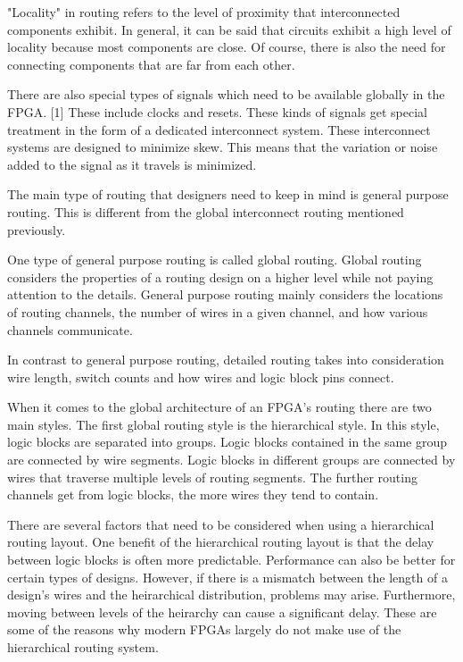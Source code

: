 \documentclass{article}
\begin{document}
    "Locality" in routing refers to the level of proximity that interconnected components
    exhibit. In general, it can be said that circuits exhibit a high level of locality
    because most components are close. Of course, there is also the need for connecting
    components that are far from each other.

    There are also special types of signals which need to be available globally
    in the FPGA. [1] These include clocks and resets. These kinds of signals get
    special treatment in the form of a dedicated interconnect system. These
    interconnect systems are designed to minimize skew. This means that the
    variation or noise added to the signal as it travels is minimized.

    The main type of routing that designers need to keep in mind is
    general purpose routing. This is different from the global interconnect routing
    mentioned previously.
    
    One type of general purpose routing is called global routing. Global routing
    considers the properties of a routing design on a higher level while not paying attention
    to the details. General purpose routing mainly considers the locations of routing
    channels, the number of wires in a given channel, and how various channels communicate.

    In contrast to general purpose routing, detailed routing takes into consideration
    wire length, switch counts and how wires and logic block pins connect.

    When it comes to the global architecture of an FPGA's routing there are two main styles.
    The first global routing style is the hierarchical style. In this style,
    logic blocks are separated into groups. Logic blocks contained in the same group
    are connected by wire segments. Logic blocks in different groups are connected
    by wires that traverse multiple levels of routing segments.
    The further routing channels get from logic blocks, the more wires they tend to contain.

    There are several factors that need to be considered when using a hierarchical routing
    layout. One benefit of the hierarchical routing layout is that the delay
    between logic blocks is often more predictable. Performance can also be better for
    certain types of designs.
    However, if there is a mismatch between the length of a design's wires and the
    heirarchical distribution, problems may arise. Furthermore, moving between levels
    of the heirarchy can cause a significant delay. These are some of the reasons
    why modern FPGAs largely do not make use of the hierarchical routing system.
\end{document}
